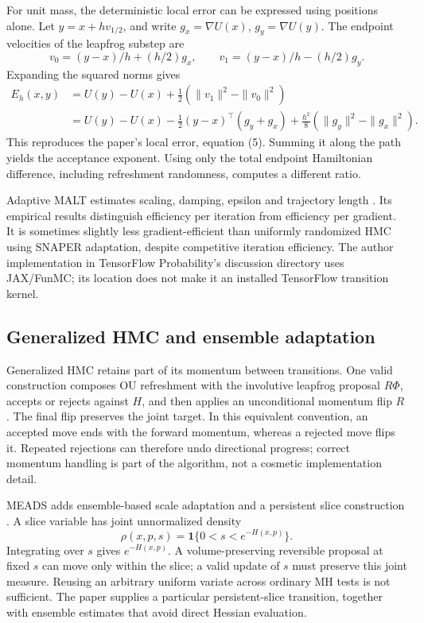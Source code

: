 For unit mass, the deterministic local error can be expressed using positions
alone. Let $y=x+h v_{1/2}$, and write $g_x=\nabla U(x)$,
$g_y=\nabla U(y)$. The endpoint velocities of the leapfrog substep are
\begin{equation}
 v_0=(y-x)/h+(h/2)g_x,\qquad
 v_1=(y-x)/h-(h/2)g_y.
 \label{eq:bf-modern-malt-velocities}
\end{equation}
Expanding the squared norms gives
\begin{align}
 E_h(x,y)&=U(y)-U(x)+\tfrac12(\|v_1\|^2-\|v_0\|^2)\\
 &=U(y)-U(x)-\tfrac12(y-x)^\top(g_y+g_x)
              +\tfrac{h^2}{8}(\|g_y\|^2-\|g_x\|^2).
 \label{eq:bf-modern-malt-local-error}
\end{align}
This reproduces the paper's local error, equation (5). Summing it along the
path yields the acceptance exponent. Using only the total endpoint
Hamiltonian difference, including refreshment randomness, computes a
different ratio.

Adaptive MALT estimates scaling, damping, epsilon and trajectory length
\citep{rioudurand2023adaptive}. Its empirical results distinguish efficiency
per iteration from efficiency per gradient. It is sometimes slightly less
gradient-efficient than uniformly randomized HMC using SNAPER adaptation,
despite competitive iteration efficiency. The author implementation in
TensorFlow Probability's discussion directory uses JAX/FunMC; its location
does not make it an installed TensorFlow transition kernel.

\subsection{Generalized HMC and ensemble adaptation}

Generalized HMC retains part of its momentum between transitions. One valid
construction composes OU refreshment with the involutive leapfrog proposal
$R\Phi$, accepts or rejects against $H$, and then applies an unconditional
momentum flip $R$. The final flip preserves the joint target. In this
equivalent convention, an accepted move ends with the forward momentum,
whereas a rejected move flips it. Repeated rejections can therefore undo
directional progress; correct momentum handling is part of the algorithm,
not a cosmetic implementation detail.

MEADS adds ensemble-based scale adaptation and a persistent slice construction
\citep{hoffman2022meads}. A slice variable has joint unnormalized density
\begin{equation}
 \rho(x,p,s)=\mathbf1\{0<s<e^{-H(x,p)}\}.
 \label{eq:bf-modern-slice-joint}
\end{equation}
Integrating over $s$ gives $e^{-H(x,p)}$. A volume-preserving reversible
proposal at fixed $s$ can move only within the slice; a valid update of $s$
must preserve this joint measure. Reusing an arbitrary uniform variate across
ordinary MH tests is not sufficient. The paper supplies a particular
persistent-slice transition, together with ensemble estimates that avoid
direct Hessian evaluation.

